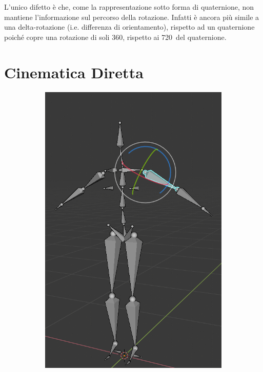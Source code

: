 L'unico difetto è che, come la rappresentazione sotto forma di quaternione, non mantiene l'informazione sul percorso della rotazione. Infatti è ancora più simile a una delta-rotazione (i.e. differenza di orientamento), rispetto ad un quaternione poiché copre una rotazione di soli 360\textdegree, rispetto ai 720\textdegree\ del quaternione. 

\newpage
\section{Cinematica Diretta} \label{sectionFK}

\begin{figure}
\centering
\begin{subfigure}{.33\textwidth}
  \centering
  \includegraphics[width=\linewidth]{Figures/armature1}

\end{subfigure}
\end{figure}
